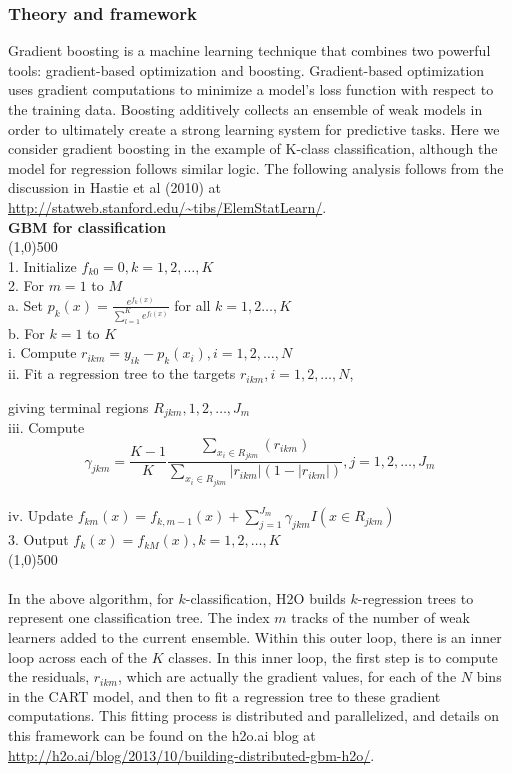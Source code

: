 \documentclass{article}[11pt]
\begin{document}
{\begin{itemize}
\end{itemize}

\subsubsection{Theory and framework} 

Gradient boosting is a machine learning technique that combines two powerful tools: gradient-based optimization and boosting. Gradient-based optimization uses gradient computations to minimize a model's loss function with respect to the training data. Boosting additively collects an ensemble of weak models in order to ultimately create a strong learning system for predictive tasks. Here we consider gradient boosting in the example of K-class classification, although the model for regression follows similar logic. The following analysis follows from the discussion in Hastie et al (2010) at {\url{http://statweb.stanford.edu/~tibs/ElemStatLearn/}}.
\newline
\\
{\bf{\footnotesize{GBM for classification}}}
\\
\line(1,0){500}
\\ 
1. Initialize $f_{k0} = 0, k = 1,2,\dots,K$ 
\\
2. For $m=1$ to $M$
\\
\indent a. Set $p_k(x) = \frac{e^{f_k(x)}}{\sum_{l=1}^K e^{f_l(x)}}$ for all $k = 1,2\dots, K$
\\
\indent b. For $k=1$ to $K$
\\
\indent \indent i. Compute $r_{ikm} = y_{ik} - p_k(x_i),  i = 1,2,\dots,N$
\\
\indent \indent ii. Fit a regression tree to the targets $r_{ikm}, i = 1,2,\dots,N$, 
\par \hspace{3em} giving terminal regions $R_{jkm}, 1,2,\dots,J_m$
\\
\indent \indent iii. Compute $$\gamma_{jkm} = \frac{K-1}{K} \frac{\sum_{x_i \in R_{jkm}} (r_{ikm})}{\sum_{x_i \in R_{jkm}} |r_{ikm}| (1 - |r_{ikm}|)} , j=1,2,\dots,J_m$$
\\
\indent \indent iv. Update $f_{km}(x) = f_{k,m-1}(x) + \sum_{j=1}^{J_m} \gamma_{jkm} I(x \in R_{jkm})$
\\
3. Output $f_k^{\hat{}}(x) = f_{kM}(x),  k=1,2,\dots,K$
\\
\line(1,0){500}
\\
\\ 
In the above algorithm, for $k$-classification, H2O builds $k$-regression trees to represent one classification tree. The index $m$ tracks of the number of weak learners added to the current ensemble. Within this outer loop, there is an inner loop across each of the $K$ classes. In this inner loop, the first step is to compute the residuals, $r_{ikm}$, which are actually the gradient values, for each of the $N$ bins in the CART model, and then to fit a regression tree to these gradient computations. This fitting process is distributed and parallelized, and details on this framework can be found on the h2o.ai blog at {\url{http://h2o.ai/blog/2013/10/building-distributed-gbm-h2o/}}.
}
\end{document}
